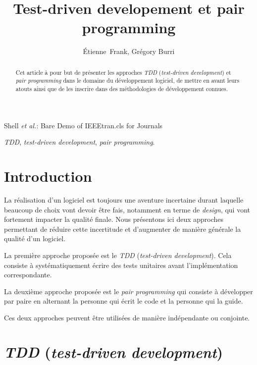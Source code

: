 \documentclass[journal, a4paper, frenchb]{IEEEtran}
\begin{document}
\title{Test-driven developement et pair programming}

\author{Étienne~Frank, Grégory Burri}

{Shell \MakeLowercase{\textit{et al.}}: Bare Demo of IEEEtran.cls for Journals}

\maketitle

\begin{abstract}
Cet article à pour but de présenter les approches \emph{TDD} (\emph{test-driven development}) et \emph{pair programming} dans le domaine du développement logiciel, de mettre en avant leurs atouts ainsi que de les inscrire dans des méthodologies de développement connues.
\end{abstract}

\begin{IEEEkeywords}
\emph{TDD}, \emph{test-driven development}, \emph{pair programming}.
\end{IEEEkeywords}


\section{Introduction}

La réalisation d'un logiciel est toujours une aventure incertaine durant laquelle beaucoup de choix vont devoir être fais, notamment en terme de \emph{design}, qui vont fortement impacter la qualité finale. Nous présentons ici deux approches permettant de réduire cette incertitude et d'augmenter de manière générale la qualité d'un logiciel.

La première approche proposée est le \emph{TDD} (\emph{test-driven development}). Cela consiste à systématiquement écrire des tests unitaires avant l'implémentation correspondante.

La deuxième approche proposée est le \emph{pair programming} qui consiste à développer par paire en alternant la personne qui écrit le code et la personne qui la guide.

Ces deux approches peuvent être utilisées de manière indépendante ou conjointe.


\section{\emph{TDD} (\emph{test-driven development})}
\end{document}
